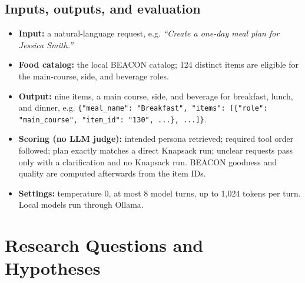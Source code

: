 \documentclass[11pt]{article}
\newcommand{\tool}[1]{\texttt{#1}}
\begin{document}
\subsection{Inputs, outputs, and evaluation}
\begin{itemize}
  \item \textbf{Input:} a natural-language request, e.g. \emph{``Create a
        one-day meal plan for Jessica Smith.''}
  \item \textbf{Food catalog:} the local BEACON catalog; 124 distinct items are
        eligible for the main-course, side, and beverage roles.
  \item \textbf{Output:} nine items, a main course, side, and beverage for
        breakfast, lunch, and dinner, e.g.
        \tool{\{"meal\_name": "Breakfast", "items": [\{"role": "main\_course",
        "item\_id": "130", ...\}, ...]\}}.
  \item \textbf{Scoring (no LLM judge):} intended persona retrieved; required tool
        order followed; plan exactly matches a direct Knapsack run; unclear
        requests pass only with a clarification and no Knapsack run. BEACON
        goodness and quality are computed afterwards from the item IDs.
  \item \textbf{Settings:} temperature 0, at most 8 model turns, up to 1,024
        tokens per turn. Local models run through Ollama.
\end{itemize}

\section{Research Questions and Hypotheses}
\end{document}

